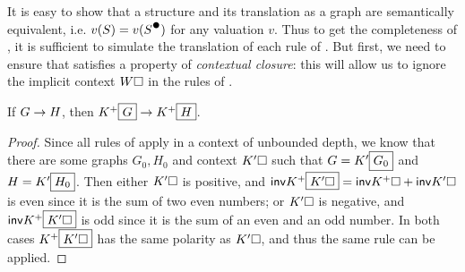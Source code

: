 It is easy to show that a structure and its translation as a graph are
semantically equivalent, i.e. $v(S) = v(\strans{S})$ for any valuation $v$. Thus
to get the completeness of , it is sufficient to simulate the
translation of each rule of . But first, we need to ensure that
 satisfies a property of \emph{contextual closure}: this will allow
us to ignore the implicit context $W\square$ in the rules of .

\begin{lemma}
  If $G \rightarrow H$, then $K^+\fbox{$G$} \rightarrow K^+\fbox{$H$}$.
\end{lemma}
\begin{proof}
  Since all rules of  apply in a context of unbounded depth, we know
  that there are some graphs $G_0, H_0$ and context $K'\square$ such that $G =
  K'\fbox{$G_0$}$ and $H = K'\fbox{$H_0$}$. Then either $K'\square$ is positive,
  and $\mathsf{inv}{K^+\fbox{$K'\square$}} = \mathsf{inv}{K^+\square} + \mathsf{inv}{K'\square}$ is
  even since it is the sum of two even numbers; or $K'\square$ is negative, and
  $\mathsf{inv}{K^+\fbox{$K'\square$}}$ is odd since it is the sum of an even and an
  odd number. In both cases $K^+\fbox{$K'\square$}$ has the same polarity as
  $K'\square$, and thus the same rule can be applied.
\end{proof}

